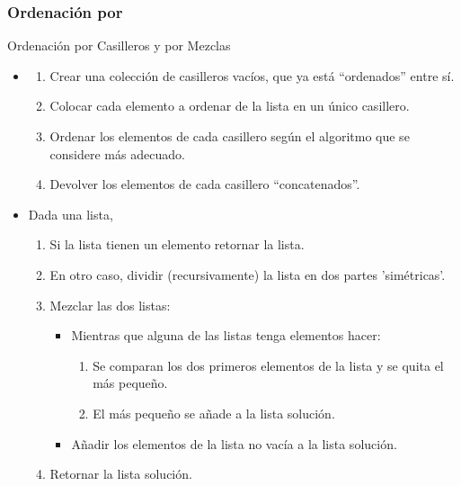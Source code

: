 \documentclass[10pt,envcountsect,spanish]{beamer}
\begin{document}
\subsubsection{Ordenación por }

\begin{frame}[fragile]{Ordenación por Casilleros y por Mezclas}

\begin{itemize}
\item {}

\begin{enumerate}
\item Crear una colección de casilleros vacíos, que ya está ``ordenados'' entre sí.
\item Colocar cada elemento a ordenar de la lista en un único casillero.
\item Ordenar los elementos de cada casillero según el algoritmo que se considere más adecuado.
\item Devolver los elementos de cada casillero ``concatenados''.
\end{enumerate}



\item {} Dada una lista, 


\begin{enumerate}
\item Si la lista tienen un elemento retornar la lista.
\item En otro caso, dividir (recursivamente) la lista en dos partes 'simétricas'.
\item Mezclar las dos listas:
	\begin{itemize}
	\item Mientras que alguna de las listas tenga elementos hacer:
		\begin{enumerate}
		\item Se comparan los dos primeros elementos de la lista y se quita el más pequeño.
		\item El más pequeño se añade a la lista solución.
		\end{enumerate}
	\item Añadir los elementos de la lista no vacía a la lista solución.
	\end{itemize}
\item Retornar la lista solución.
\end{enumerate}

\end{itemize}

\end{frame}
\end{document}
